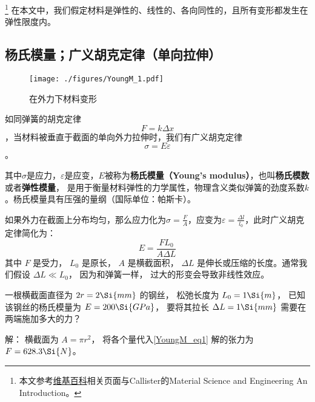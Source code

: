 
\begin{issues}
\issueDraft
\end{issues}

\footnote{本文参考\href{https://en.wikipedia.org/wiki/Young's_modulus}{维基百科}相关页面与Callister的Material Science and Engineering An Introduction。}
在本文中，我们假定材料是弹性的、线性的、各向同性的，且所有变形都发生在弹性限度内。

\subsection{杨氏模量；广义胡克定律（单向拉伸）}
\begin{figure}[ht]
\centering
\texttt{[image: ./figures/YoungM\_1.pdf]}
\caption{在外力下材料变形} \label{YoungM_fig1}
\end{figure}

如同弹簧的胡克定律$$F=k \Delta x$$，当材料被垂直于截面的单向外力拉伸时，我们有广义胡克定律
\begin{equation}
\sigma = E \varepsilon
\end{equation}。

其中$\sigma$是应力，$\varepsilon$是应变，$E$被称为\textbf{杨氏模量（Young's modulus）}，也叫\textbf{杨氏模数}或者\textbf{弹性模量}， 是用于衡量材料弹性的力学属性，物理含义类似弹簧的劲度系数$k$。杨氏模量具有压强的量纲（国际单位：帕斯卡）。

如果外力在截面上分布均匀，那么应力化为$\sigma=\frac{F}{A}$，应变为$\varepsilon=\frac{\Delta l}{l_0}$，此时广义胡克定律简化为：
\begin{equation}\label{YoungM_eq1}
E = \frac{FL_0}{A\Delta L}
\end{equation}
其中 $F$ 是受力， $L_0$ 是原长， $A$ 是横截面积， $\Delta L$ 是伸长或压缩的长度。通常我们假设 $\Delta L \ll L_0$， 因为和弹簧一样， 过大的形变会导致非线性效应。

\begin{example}{}
一根横截面直径为 $2r = 2\Si{mm}$ 的钢丝， 松弛长度为 $L_0 = 1\Si{m}$， 已知该钢丝的杨氏模量为 $E = 200\Si{GPa}$， 要将其拉长 $\Delta L = 1\Si{mm}$ 需要在两端施加多大的力？

解： 横截面为 $A = \pi r^2$， 将各个量代入\autoref{YoungM_eq1} 解的张力为 $F = 628.3\Si{N}$。
\end{example}

